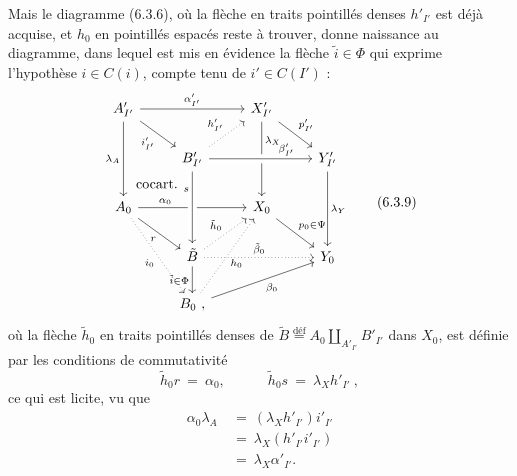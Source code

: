 \documentclass[11pt]{article}
\newcommand{\printedpage}[1]{\marginpar{\footnotesize p.~#1}}
\newcommand{\msp}[1]{\marginpar{\footnotesize [#1]}}
\begin{document}
\msp{page 113}Mais le diagramme (6.3.6), où la flèche en traits pointillés denses $h'_{I'}$ est déjà acquise, et $h_0$ en pointillés espacés reste à trouver, donne naissance au diagramme, dans lequel est mis en évidence la flèche $\tilde{i} \in \Phi$ qui exprime l'hypothèse $i \in C(i)$, %
compte tenu de $i' \in C(I')$ :
\[
\begin{tikzcd}
A'_{I'} \arrow[rr, "\alpha'_{I'}"] \arrow[dr, "i'_{I'}"'] \arrow[dd, "\lambda_A"'] & & X'_{I'} \arrow[dr, "p'_{I'}"] \arrow[dd, "\lambda_X" near start] & \\
 & B'_{I'} \arrow[ur, dotted, "h'_{I'}"] \arrow[rr, crossing over, "\beta'_{I'}" near end] & & Y'_{I'} \arrow[dd, "\lambda_Y"] \\
A_0 \arrow[ur, phantom, "\text{cocart.}"] \arrow[rr, "\alpha_0" near start] \arrow[dr, "r"'] \arrow[ddr, dotted, "i_0"'] & & X_0 \arrow[dr, "p_0\in\Psi"] & \\
 & \tilde{B} \arrow[from=2-2, crossing over, "s"' near start] \arrow[ur, dotted, "\tilde{h}_0"] \arrow[rr, dotted, "\tilde{\beta}_0"] \arrow[d, "\tilde{i}\in\Phi"'] & & Y_0 \\
 & B_0\ , \arrow[uur, dotted, "h_0"'] \arrow[urr, "\beta_0"'] & &
\end{tikzcd}
\tag*{(6.3.9)}
\]
\printedpage{57}
où la flèche $\tilde{h}_0$ en traits pointillés denses de $\tilde{B} \overset{\text{déf}}{=} A_0 \amalg_{A'_{I'}} B'_{I'}$ dans $X_0$, est définie par les conditions de commutativité
\[
\tilde{h}_0r \ =\ \alpha_0, \qquad\quad \tilde{h}_0s \ =\ \lambda_X h'_{I'}\ ,
\tag*{(6.3.10)}
\]
ce qui est licite, vu que
\[
\begin{aligned}
\alpha_0\lambda_A \ &=\ (\lambda_X h'_{I'})i'_{I'} \\
&=\ \lambda_X(h'_{I'}i'_{I'}) \\
&=\ \lambda_X\alpha'_{I'}.
\end{aligned}
\]
\end{document}

